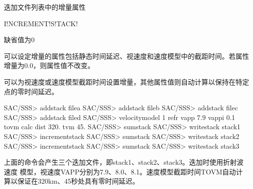 \label{sss:incrementstack}

迭加文件列表中的增量属性

\begin{SACSTX}
I!NCREMENT!S!TACK!
\end{SACSTX}


缺省值为0

可以设定增量的属性包括静态时间延迟、视速度和速度模型中的截距时间。若属性
增量为0.0，则属性值不改变。

可以为视速度或速度模型截距时间设置增量，其他属性值则自动计算以保持在特定点的零时间延迟。

\begin{SACCode}
SAC/SSS> addstack filea
SAC/SSS> addstack fileb
SAC/SSS> addstack filec
SAC/SSS> addstack filed
SAC/SSS> velocitymodel 1 refr vapp 7.9 vappi 0.1 tovm calc dist 320. tvm 45.
SAC/SSS> sumstack
SAC/SSS> writestack stack1
SAC/SSS> incrementstack
SAC/SSS> sumstack
SAC/SSS> writestack stack2
SAC/SSS> incrementstack
SAC/SSS> sumstack
SAC/SSS> writestack stack3
\end{SACCode}

上面的命令会产生三个迭加文件，即stack1、stack2、stack3。迭加时使用折射波速度
模型，视速度VAPP分别为7.9、8.0、8.1。速度模型截距时间TOVM自动计算以保证在320km、45秒处具有零时间延迟。

